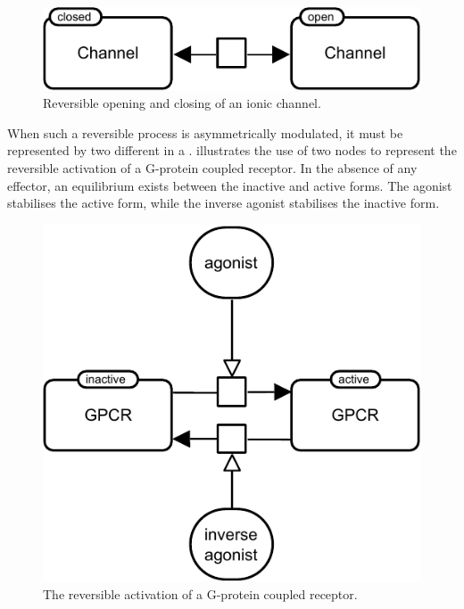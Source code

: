 \begin{figure}[H]
  \centering
  \includegraphics[scale = 0.8]{examples/process-reversible}
  \caption{Reversible opening and closing of an ionic channel.}
  \label{fig:trans-reverse}
\end{figure}

When such a reversible process is asymmetrically modulated, it must be represented by two different  in a \PD.   illustrates the use of two  nodes to represent the reversible activation of a G-protein coupled receptor.  In the absence of any effector, an equilibrium exists between the inactive and active forms.  The agonist stabilises the active form, while the inverse agonist stabilises the inactive form.

\begin{figure}[H]
  \centering
  \includegraphics[scale = 0.8]{examples/process-modulated}
  \caption{The reversible activation of a G-protein coupled receptor.}
  \label{fig:trans-mod}
\end{figure}

